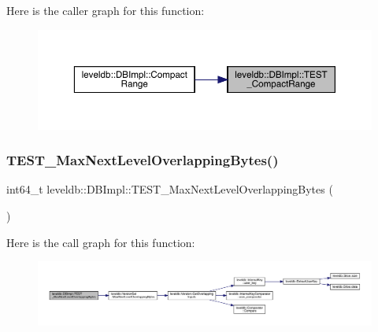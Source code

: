 Here is the caller graph for this function\+:
\nopagebreak
\begin{figure}[H]
\begin{center}
\leavevmode
\includegraphics[width=350pt]{classleveldb_1_1_d_b_impl_a63fcb49466b689a534ba77d32cf84f99_icgraph}
\end{center}
\end{figure}
\mbox{\label{classleveldb_1_1_d_b_impl_af621636048b8d3cfaa21238fe26ef0ca}} 
\subsubsection{\texorpdfstring{TEST\_MaxNextLevelOverlappingBytes()}{TEST\_MaxNextLevelOverlappingBytes()}}
{\footnotesize\ttfamily int64\+\_\+t leveldb\+::\+D\+B\+Impl\+::\+T\+E\+S\+T\+\_\+\+Max\+Next\+Level\+Overlapping\+Bytes (\begin{DoxyParamCaption}{ }\end{DoxyParamCaption})}

Here is the call graph for this function\+:
\nopagebreak
\begin{figure}[H]
\begin{center}
\leavevmode
\includegraphics[width=350pt]{classleveldb_1_1_d_b_impl_af621636048b8d3cfaa21238fe26ef0ca_cgraph}
\end{center}
\end{figure}
\mbox{\label{classleveldb_1_1_d_b_impl_adba5bf4252bd94f7db50e62921b7ba53}} 
